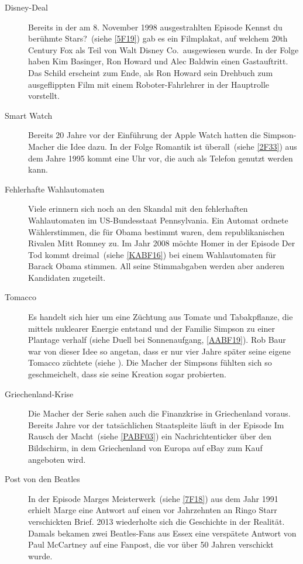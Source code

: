 \begin{appendix}
\begin{description}
  \item[Disney-Deal] Bereits in der am 8. November 1998 ausgestrahlten Episode \glqq Kennst du berühmte Stars?\grqq\ (siehe \ref{5F19}) gab es ein Filmplakat, auf welchem 20th Century Fox als Teil von \glqq Walt Disney Co.\grqq\ ausgewiesen wurde. In der Folge haben Kim Basinger, Ron Howard und Alec Baldwin einen Gastauftritt. Das Schild erscheint zum Ende, als Ron Howard sein Drehbuch zum ausgeflippten Film mit einem Roboter-Fahrlehrer in der Hauptrolle vorstellt.
  \item[Smart Watch] Bereits 20 Jahre vor der Einführung der Apple Watch hatten die Simpson-Macher die Idee dazu. In der Folge \glqq Romantik ist überall\grqq\ (siehe \ref{2F33}) aus dem Jahre 1995 kommt eine Uhr vor, die auch als Telefon genutzt werden kann.
  \item[Fehlerhafte Wahlautomaten] Viele erinnern sich noch an den Skandal mit den fehlerhaften Wahlautomaten im US-Bundesstaat Pennsylvania. Ein Automat ordnete Wählerstimmen, die für Obama bestimmt waren, dem republikanischen Rivalen Mitt Romney zu. Im Jahr 2008 möchte Homer in der Episode \glqq Der Tod kommt dreimal\grqq\ (siehe \ref{KABF16}) bei einem Wahlautomaten für Barack Obama stimmen. All seine Stimmabgaben werden aber anderen Kandidaten zugeteilt.
  \item[Tomacco] Es handelt sich hier um eine Züchtung aus Tomate und Tabakpflanze, die mittels nuklearer Energie entstand und der Familie Simpson zu einer Plantage verhalf (siehe \glqq Duell bei Sonnenaufgang\grqq, \ref{AABF19}). Rob Baur war von dieser Idee so angetan, dass er nur vier Jahre später seine eigene Tomacco züchtete (siehe \cite{RobBaur}). Die Macher der Simpsons fühlten sich so geschmeichelt, dass sie seine Kreation sogar probierten.
  \item[Griechenland-Krise] Die Macher der Serie sahen auch die Finanzkrise in Griechenland voraus. Bereits Jahre vor der tatsächlichen Staatspleite läuft in der Episode \glqq Im Rausch der Macht\grqq\ (siehe \ref{PABF03}) ein Nachrichtenticker über den Bildschirm, in dem Griechenland von Europa auf eBay zum Kauf angeboten wird.
  \item[Post von den Beatles] In der Episode \glqq Marges Meisterwerk\grqq\ (siehe \ref{7F18}) aus dem Jahr 1991 erhielt Marge eine Antwort auf einen vor Jahrzehnten an Ringo Starr verschickten Brief. 2013 wiederholte sich die Geschichte in der Realität. Damals bekamen zwei Beatles-Fans aus Essex eine verspätete Antwort von Paul McCartney auf eine Fanpost, die vor über 50 Jahren verschickt wurde.

\end{description}
\end{appendix}
